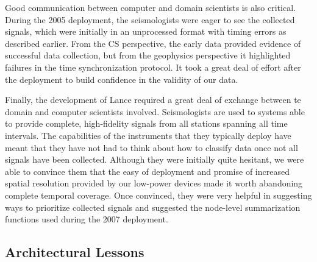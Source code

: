 \begin{itemize}
Good communication between computer and domain scientists is also critical.
During the 2005 deployment, the seismologists were eager to see the collected
signals, which were initially in an unprocessed format with timing errors as
described earlier. From the CS perspective, the early data provided evidence
of successful data collection, but from the geophysics perspective it
highlighted failures in the time synchronization protocol. It took a great
deal of effort after the deployment to build confidence in the validity of
our data.

Finally, the development of Lance required a great deal of exchange between
te domain and computer scientists involved. Seismologists are used to systems
able to provide complete, high-fidelity signals from all stations spanning
all time intervals. The capabilities of the instruments that they typically
deploy have meant that they have not had to think about how to classify data
once not all signals have been collected. Although they were initially quite
hesitant, we were able to convince them that the easy of deployment and
promise of increased spatial resolution provided by our low-power devices
made it worth abandoning complete temporal coverage. Once convinced, they
were very helpful in suggesting ways to prioritize collected signals and
suggested the node-level summarization functions used during the 2007
deployment.

\end{itemize}

\subsection{Architectural Lessons}

